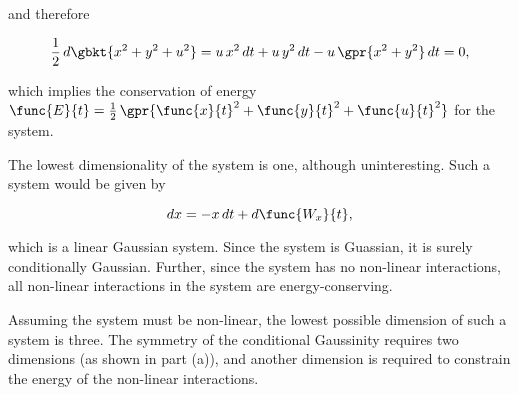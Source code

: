 \begin{enumerate}[(a)]
	and therefore
	
	\begin{equation}
		\frac{1}{2}\,d\gbkt{x^2 + y^2 + u^2} = u\,x^2\,dt + u\,y^2\,dt - u\,\gpr{x^2 + y^2}\,dt = 0,
	\end{equation}
	
	which implies the conservation of energy $\func{E}{t} = \frac{1}{2}\,\gpr{\func{x}{t}^2 + \func{y}{t}^2 + \func{u}{t}^2}$ for the system. 
	
	The lowest dimensionality of the system is one, although uninteresting. Such a system would be given by
	
	\begin{equation}
		dx = -x\,dt + d\func{W_x}{t},
	\end{equation}
	
	which is a linear Gaussian system. Since the system is Guassian, it is surely conditionally Gaussian. Further, since the system has no non-linear interactions, all non-linear interactions in the system are energy-conserving.
	
	Assuming the system must be non-linear, the lowest possible dimension of such a system is three. The symmetry of the conditional Gaussinity requires two dimensions (as shown in part (a)), and another dimension is required to constrain the energy of the non-linear interactions.

\end{enumerate}
